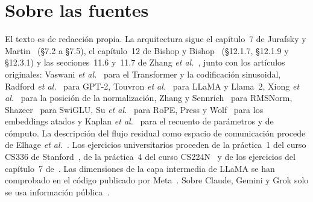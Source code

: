 \documentclass[11pt,a4paper,twoside,openany]{book}
\begin{document}
\section*{Sobre las fuentes}
El texto es de redacción propia. La arquitectura sigue el capítulo~7 de Jurafsky y Martin~\cite{jm3} (§7.2 a §7.5), el capítulo~12 de Bishop y Bishop~\cite{bishopdl} (§12.1.7, §12.1.9 y §12.3.1) y las secciones~11.6 y~11.7 de Zhang \emph{et al.}~\cite{d2l}, junto con los artículos originales: Vaswani \emph{et al.}~\cite{vaswani} para el Transformer y la codificación sinusoidal, Radford \emph{et al.}~\cite{gpt2} para GPT-2, Touvron \emph{et al.}~\cite{llama,llama2} para LLaMA y Llama~2, Xiong \emph{et al.}~\cite{xiong} para la posición de la normalización, Zhang y Sennrich~\cite{rmsnorm} para RMSNorm, Shazeer~\cite{shazeer} para SwiGLU, Su \emph{et al.}~\cite{roformer} para RoPE, Press y Wolf~\cite{presswolf} para los embeddings atados y Kaplan \emph{et al.}~\cite{kaplan} para el recuento de parámetros y de cómputo. La descripción del flujo residual como espacio de comunicación procede de Elhage \emph{et al.}~\cite{elhage}. Los ejercicios universitarios proceden de la práctica~1 del curso CS336 de Stanford~\cite{cs336}, de la práctica~4 del curso CS224N~\cite{cs224n} y de los ejercicios del capítulo~7 de~\cite{jm3}. Las dimensiones de la capa intermedia de LLaMA se han comprobado en el código publicado por Meta~\cite{llamacode}. Sobre Claude, Gemini y Grok solo se usa información pública~\cite{gemini15,grok1}.
\end{document}
